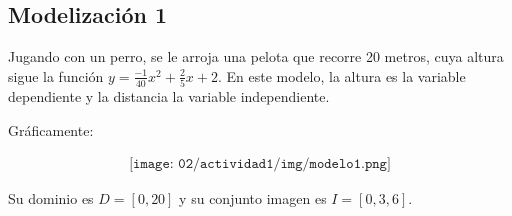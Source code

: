 \subsection*{Modelización 1}

Jugando con un perro, se le arroja una pelota que recorre 20 metros, cuya altura sigue la función $y = \frac{-1}{40}x^2+\frac{2}{5}x+2$. En este modelo, la altura es la variable dependiente y la distancia la variable independiente. 

Gráficamente:

\begin{align*}
	\texttt{[image: 02/actividad1/img/modelo1.png]}
\end{align*}

Su dominio es $D = [0,20]$ y su conjunto imagen es $I = [0, 3,6]$.
